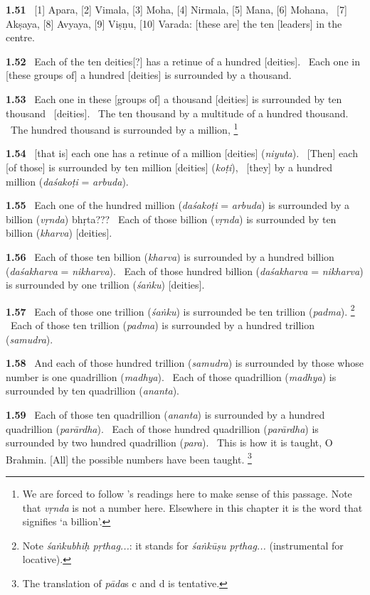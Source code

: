 \documentclass{article}
\newcommand{\skt}[1]{\textit{#1}}
\begin{document}
\textbf{1.51}%
\ [1] Apara, [2] Vimala, [3] Moha, [4] Nirmala, [5] Mana, [6] Mohana,%
\ [7] Akṣaya, [8] Avyaya, [9] Viṣṇu, [10] Varada: [these are] the ten [leaders] in the centre.%


\textbf{1.52}%
\ Each of the ten deities[?] has a retinue of a hundred [deities].%
\ Each one in [these groups of] a hundred [deities] is surrounded by a thousand.%


\textbf{1.53}%
\ Each one in these [groups of] a thousand [deities] is surrounded by ten thousand%
\                                         [deities].%
\ The ten thousand by a multitude of a hundred thousand.%
\                  The hundred thousand is surrounded by a million,%
\footnote{We are forced to follow \Ed's readings here to make sense of this passage.              Note that \skt{vṛnda} is not a number here. Elsewhere in this chapter it is the word that                                        signifies `a billion'. }%


\textbf{1.54}%
\ [that is] each one has a retinue of a million [deities] (\skt{niyuta}).%
\ [Then] each [of those] is surrounded by ten million [deities] (\skt{koṭi}),%
\                 [they] by a hundred million (\skt{daśakoṭi} = \skt{arbuda}).%


\textbf{1.55}%
\ Each one of the hundred million (\skt{daśakoṭi} = \skt{arbuda}) is surrounded by a billion (\skt{vṛnda}) bhṛta???%
\ Each of those billion (\skt{vṛnda}) is surrounded by ten billion (\skt{kharva}) [deities].%


\textbf{1.56}%
\ Each of those ten billion (\skt{kharva}) is surrounded by a hundred billion (\skt{daśakharva} = \skt{nikharva}).%
\ Each of those hundred billion (\skt{daśakharva} = \skt{nikharva}) is surrounded by one trillion (\skt{śaṅku}) [deities].%


\textbf{1.57}%
\ Each of those one trillion (\skt{śaṅku}) is surrounded be ten trillion (\skt{padma}).%
\footnote{Note \skt{śaṅkubhiḥ pṛthag...}: it stands for \skt{śaṅkūṣu pṛthag...} (instrumental for locative). }%
\ Each of those ten trillion (\skt{padma}) is surrounded by a hundred trillion (\skt{samudra}).%


\textbf{1.58}%
\ And each of those hundred trillion (\skt{samudra}) is surrounded by those whose number is one quadrillion (\skt{madhya}).%
\ Each of those quadrillion (\skt{madhya}) is surrounded by ten quadrillion (\skt{ananta}).%


\textbf{1.59}%
\ Each of those ten quadrillion (\skt{ananta}) is surrounded by a hundred quadrillion (\skt{parārdha}).%
\ Each of those hundred quadrillion (\skt{parārdha}) is surrounded by two hundred quadrillion (\skt{para}).%
\ This is how it is taught, O Brahmin. [All] the possible numbers have been taught.%
\footnote{The translation of \skt{pāda}s c and d is tentative. }%
\end{document}
